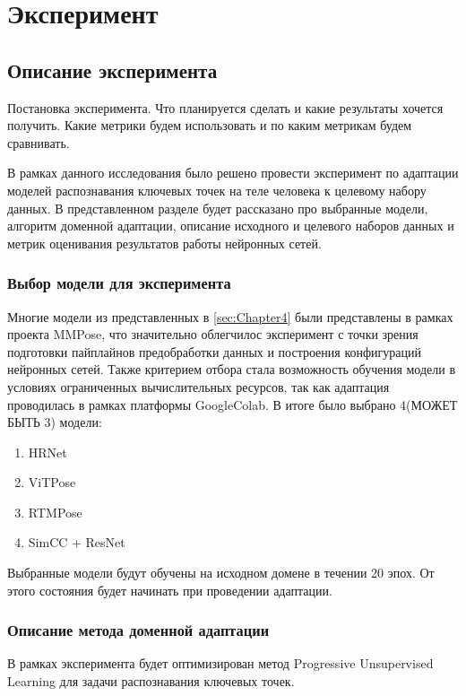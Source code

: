 \section{Эксперимент}
\label{sec:Chapter5} 

\subsection{Описание эксперимента}

Постановка эксперимента. Что планируется сделать и какие результаты хочется получить. Какие метрики будем использовать и по каким метрикам будем сравнивать.

В рамках данного исследования было решено провести эксперимент по адаптации моделей распознавания ключевых точек на теле человека к целевому набору данных. В представленном разделе будет рассказано про выбранные модели, алгоритм доменной адаптации, описание исходного и целевого наборов данных и метрик оценивания результатов работы нейронных сетей.

\subsubsection*{Выбор модели для эксперимента}

Многие модели из представленных в \autoref{sec:Chapter4} были представлены в рамках проекта MMPose, что значительно облегчилос эксперимент с точки зрения подготовки пайплайнов предобработки данных и построения конфигураций нейронных сетей. Также критерием отбора стала возможность обучения модели в условиях ограниченных вычислительных ресурсов, так как адаптация проводилась в рамках платформы GoogleColab. В итоге было выбрано 4(МОЖЕТ БЫТЬ 3) модели:
\begin{enumerate}
\item HRNet
\item ViTPose
\item RTMPose
\item SimCC + ResNet
\end{enumerate}

Выбранные модели будут обучены на исходном домене в течении 20 эпох. От этого состояния будет начинать при проведении адаптации.

\subsubsection*{Описание метода доменной адаптации}

В рамках эксперимента будет оптимизирован метод Progressive Unsupervised Learning \cite{pul} для задачи распознавания ключевых точек. 

